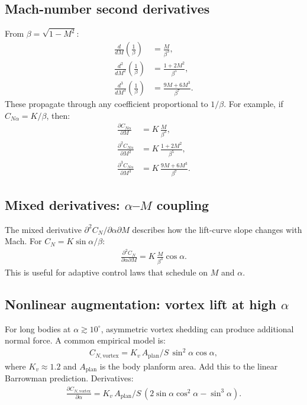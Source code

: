 \documentclass[11pt]{article}
\begin{document}
\subsection{Mach-number second derivatives}
From $\beta=\sqrt{1-M^2}$:
\begin{align}
\frac{d}{dM}\left(\frac{1}{\beta}\right) &= \frac{M}{\beta^3},\\
\frac{d^2}{dM^2}\left(\frac{1}{\beta}\right) &= \frac{1+2M^2}{\beta^5},\\
\frac{d^3}{dM^3}\left(\frac{1}{\beta}\right) &= \frac{9M+6M^3}{\beta^7}.
\end{align}
These propagate through any coefficient proportional to $1/\beta$. For example, if $C_{N\alpha} = K/\beta$, then:
\begin{align}
\frac{\partial C_{N\alpha}}{\partial M} &= K\,\frac{M}{\beta^3},\\
\frac{\partial^2 C_{N\alpha}}{\partial M^2} &= K\,\frac{1+2M^2}{\beta^5},\\
\frac{\partial^3 C_{N\alpha}}{\partial M^3} &= K\,\frac{9M+6M^3}{\beta^7}.
\end{align}

\subsection{Mixed derivatives: $\alpha$--$M$ coupling}
The mixed derivative $\partial^2 C_N/\partial\alpha\partial M$ describes how the lift-curve slope changes with Mach. For $C_N=K\sin\alpha/\beta$:
\begin{align}
\frac{\partial^2 C_N}{\partial\alpha\partial M} = K\,\frac{M}{\beta^3}\cos\alpha.
\end{align}
This is useful for adaptive control laws that schedule on $M$ and $\alpha$.

\subsection{Nonlinear augmentation: vortex lift at high $\alpha$}
For long bodies at $\alpha \gtrsim 10^\circ$, asymmetric vortex shedding can produce additional normal force. A common empirical model is:
\begin{align}
C_{N,\text{vortex}} = K_v\,A_{\text{plan}}/S\,\sin^2\alpha\cos\alpha,
\end{align}
where $K_v\approx 1.2$ and $A_{\text{plan}}$ is the body planform area. Add this to the linear Barrowman prediction. Derivatives:
\begin{align}
\frac{\partial C_{N,\text{vortex}}}{\partial\alpha} = K_v\,A_{\text{plan}}/S\,(2\sin\alpha\cos^2\alpha - \sin^3\alpha).
\end{align}
\end{document}
